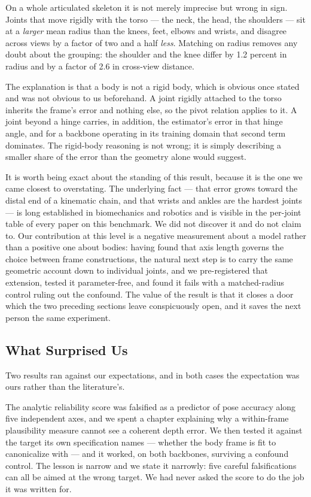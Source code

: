 \documentclass[12pt,a4paper]{report}
\begin{document}
On a whole articulated skeleton it is not merely imprecise but wrong in sign. Joints that move rigidly with the torso --- the neck, the head, the shoulders --- sit at a \emph{larger} mean radius than the knees, feet, elbows and wrists, and disagree across views by a factor of two and a half \emph{less}. Matching on radius removes any doubt about the grouping: the shoulder and the knee differ by 1.2 percent in radius and by a factor of 2.6 in cross-view distance.

The explanation is that a body is not a rigid body, which is obvious once stated and was not obvious to us beforehand. A joint rigidly attached to the torso inherits the frame's error and nothing else, so the pivot relation applies to it. A joint beyond a hinge carries, in addition, the estimator's error in that hinge angle, and for a backbone operating in its training domain that second term dominates. The rigid-body reasoning is not wrong; it is simply describing a smaller share of the error than the geometry alone would suggest.

It is worth being exact about the standing of this result, because it is the one we came closest to overstating. The underlying fact --- that error grows toward the distal end of a kinematic chain, and that wrists and ankles are the hardest joints --- is long established in biomechanics and robotics and is visible in the per-joint table of every paper on this benchmark. We did not discover it and do not claim to. Our contribution at this level is a negative measurement about a model rather than a positive one about bodies: having found that axis length governs the choice between frame constructions, the natural next step is to carry the same geometric account down to individual joints, and we pre-registered that extension, tested it parameter-free, and found it fails with a matched-radius control ruling out the confound. The value of the result is that it closes a door which the two preceding sections leave conspicuously open, and it saves the next person the same experiment.

\subsection*{What Surprised Us}

Two results ran against our expectations, and in both cases the expectation was ours rather than the literature's.

The analytic reliability score was falsified as a predictor of pose accuracy along five independent axes, and we spent a chapter explaining why a within-frame plausibility measure cannot see a coherent depth error. We then tested it against the target its own specification names --- whether the body frame is fit to canonicalize with --- and it worked, on both backbones, surviving a confound control. The lesson is narrow and we state it narrowly: five careful falsifications can all be aimed at the wrong target. We had never asked the score to do the job it was written for.
\end{document}
